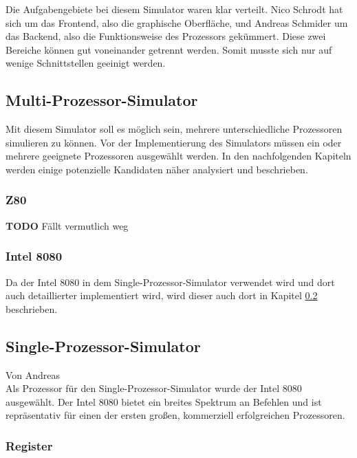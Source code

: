 \documentclass[12pt]{article}
\newcommand{\todo}{\textbf{TODO}}
\begin{document}
\noindent
Die Aufgabengebiete bei diesem Simulator waren klar verteilt. Nico Schrodt hat sich um das Frontend, also die graphische Oberfläche, und Andreas Schmider um das Backend, also die Funktionsweise des Prozessors gekümmert. Diese zwei Bereiche können gut voneinander getrennt werden. Somit musste sich nur auf wenige Schnittstellen geeinigt werden.


\newpage

\subsection{Multi-Prozessor-Simulator}
Mit diesem Simulator soll es möglich sein, mehrere unterschiedliche Prozessoren simulieren zu können. Vor der Implementierung des Simulators müssen ein oder mehrere geeignete Prozessoren ausgewählt werden. In den nachfolgenden Kapiteln werden einige potenzielle Kandidaten näher analysiert und beschrieben.

\subsubsection{Z80}
\todo
Fällt vermutlich weg

\subsubsection{Intel 8080}
Da der Intel 8080 in dem Single-Prozessor-Simulator verwendet wird und dort auch detaillierter implementiert wird, wird dieser auch dort in Kapitel \ref{SPS} beschrieben.


\newpage

\subsection{Single-Prozessor-Simulator}
\label{SPS} 
Von Andreas\\ 

\noindent
Als Prozessor für den Single-Prozessor-Simulator wurde der Intel 8080 ausgewählt. Der Intel 8080 bietet ein breites Spektrum an Befehlen und ist repräsentativ für einen der ersten großen, kommerziell erfolgreichen Prozessoren.

\subsubsection{Register}
\label{RegisterSection}
\end{document}
